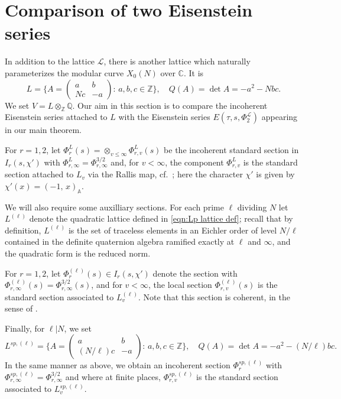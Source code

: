\documentclass[reqno,oneside]{amsart}
\theoremstyle{plain}
\theoremstyle{remark}
\numberwithin{theorem}{section}
\newcommand{\bbQ}{\mathbb Q}
\newcommand{\bbZ}{\mathbb Z}
\newcommand{\calL}{\mathcal L}
\newcommand{\A}{\mathbb{A}}
\newcommand{\Z}{\mathbb{Z}}
\newcommand{\C}{\mathbb{C}}
\begin{document}
	
	\section{Comparison of two Eisenstein series}
	In addition to the lattice $\calL$, there is another lattice which naturally parameterizes the modular curve $X_0(N)$ over $\C$. It is
	$$
	L=\{ A= \begin{pmatrix} a & b \\ N c & -a \end{pmatrix}:\, a, b, c \in \Z\}, \quad Q(A) = \det A =-a^2 - N bc.
	$$
	We set $V = L \otimes_{\bbZ} \bbQ$. Our aim in this section is to compare the incoherent Eisenstein series attached to $L$ with the Eisenstein series $E(\tau, s, \Phi_2^{\calL})$ appearing in our main theorem.
	
	
	For $r = 1,2$, let $\Phi^L_r (s) = \otimes_{v \leq \infty} \Phi_{r,v}^L(s) $ be the incoherent standard section in $I_r(s, \chi')$ with $\Phi^L_{r, \infty} = \Phi_{r, \infty}^{3/2}$ and, for $v < \infty$, the component $\Phi^L_{r,v}$ is the standard section attached to $L_v$ via the Rallis map, cf.\ ; here the character $\chi'$ is given by $\chi'(x) = (-1, \,x) _\A$.
	
	
	We will also require some auxilliary sections. For each prime $\ell$ dividing $N$ let $L^{(\ell)}$ denote the quadratic lattice defined in \eqref{eqn:Lp lattice def}; recall that by definition, $L^{(\ell)}$ is the set of traceless elements in an Eichler order of level $N/\ell$ contained in the definite quaternion algebra ramified exactly at $\ell$ and $\infty$, and the quadratic form is the reduced norm.
	
	For $r=1,2$, let $\Phi^{(\ell)}_r(s) \in I_r(s, \chi')$ denote the  section with $\Phi^{(\ell)}_{r, \infty}(s) = \Phi^{3/2}_{r, \infty}(s)$, and for $v < \infty$, the local section $\Phi^{(\ell)}_{r,v}(s) $ is the standard section associated to $L^{(\ell)}_v$. Note that this section is coherent, in the sense of \cite{KudlaCentralDerivs}.
	
	Finally, for $\ell | N$, we set
	\begin{equation}
	L^{sp, (\ell)}  = \{ A= \begin{pmatrix} a & b \\ (N/{\ell}) c & -a \end{pmatrix}:\, a, b, c \in \Z\}, \quad Q(A) = \det A =-a^2 - (N/\ell) bc.
	\end{equation}
	In the same manner as above, we obtain an incoherent section $\Phi_r^{sp, (\ell)}$ with $\Phi_{r,\infty}^{sp, (\ell)} = \Phi_{r,\infty}^{3/2}$ and where at finite places, $\Phi_{r,v}^{sp, (\ell)}$ is the standard section associated to $L^{sp, (\ell)}_v$.
	
\end{document}
